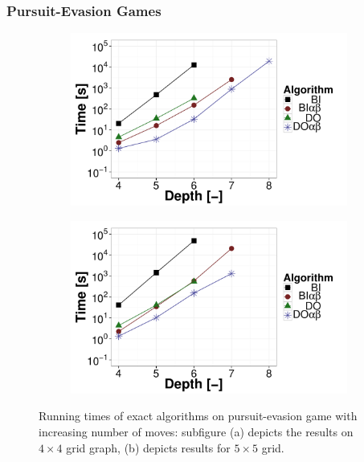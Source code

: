 \subsubsection{Pursuit-Evasion Games}
\begin{figure}
\centering
	\begin{subfigure}{0.49\textwidth}
		\includegraphics[width=1\textwidth]{figures/PEG4x4.pdf}\caption{}\label{fig:off:res:peg4}
	\end{subfigure}
	\begin{subfigure}{0.49\textwidth}
		\includegraphics[width=1\textwidth]{figures/PEG5x5.pdf}\caption{}\label{fig:off:res:peg5}
	\end{subfigure}
\caption{Running times of exact algorithms on pursuit-evasion game with increasing number of moves: subfigure (a) depicts the results on $4\times4$ grid graph, (b) depicts results for $5\times5$ grid.} \label{fig:off:res:peg}
\end{figure}

